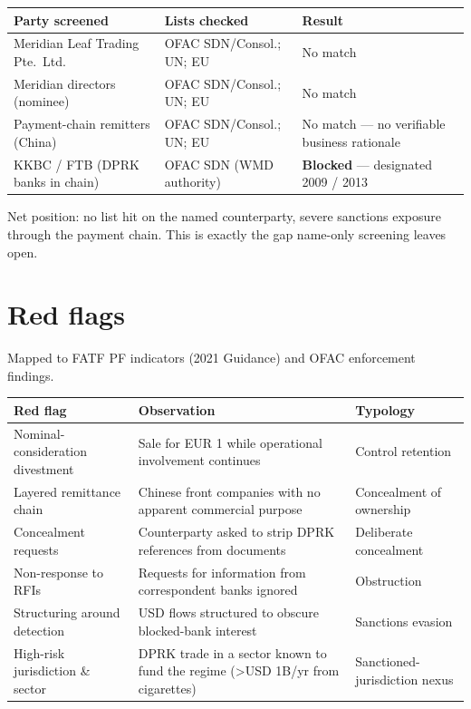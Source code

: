 \documentclass[10.5pt]{article}
\begin{document}
\begin{longtable}{@{}L{3.6cm}L{6cm}L{4.4cm}@{}}
\toprule
\textbf{Party screened} & \textbf{Lists checked} & \textbf{Result} \\
\midrule
Meridian Leaf Trading Pte.\ Ltd. & OFAC SDN/Consol.; UN; EU & No match \\
Meridian directors (nominee) & OFAC SDN/Consol.; UN; EU & No match \\
Payment-chain remitters (China) & OFAC SDN/Consol.; UN; EU & No match --- no verifiable business rationale \\
KKBC / FTB (DPRK banks in chain) & OFAC SDN (WMD authority) & \textbf{Blocked} --- designated 2009 / 2013 \\
\bottomrule
\end{longtable}

Net position: no list hit on the named counterparty, severe sanctions exposure through the payment chain. This is exactly the gap name-only screening leaves open.

\section{Red flags}
Mapped to FATF PF indicators (2021 Guidance) and OFAC enforcement findings.

\begin{longtable}{@{}L{3cm}L{7.5cm}L{3.5cm}@{}}
\toprule
\textbf{Red flag} & \textbf{Observation} & \textbf{Typology} \\
\midrule
Nominal-consideration divestment & Sale for EUR 1 while operational involvement continues & Control retention \\
Layered remittance chain & Chinese front companies with no apparent commercial purpose & Concealment of ownership \\
Concealment requests & Counterparty asked to strip DPRK references from documents & Deliberate concealment \\
Non-response to RFIs & Requests for information from correspondent banks ignored & Obstruction \\
Structuring around detection & USD flows structured to obscure blocked-bank interest & Sanctions evasion \\
High-risk jurisdiction \& sector & DPRK trade in a sector known to fund the regime (\textgreater USD 1B/yr from cigarettes) & Sanctioned-jurisdiction nexus \\
\bottomrule
\end{longtable}
\end{document}
